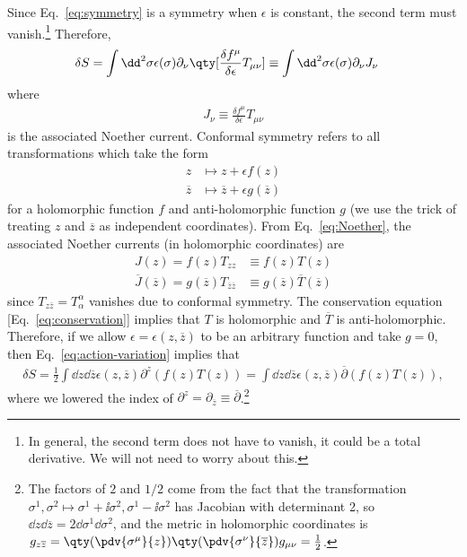 Since Eq.~\eqref{eq:symmetry} is a symmetry when $\epsilon$ is constant, the second term must
vanish.\footnote{In general, the second term does not have to vanish, it could be
  a total derivative. We will not need to worry about this.} Therefore,
\begin{align}
\delta S
&= \int \dd^2 \sigma \epsilon(\sigma) \partial_\nu \qty[\frac{\delta f^\mu}{\delta \epsilon}T_{\mu \nu}] \equiv \int \dd^2 \sigma \epsilon(\sigma) \partial_\nu J_\nu \label{eq:action-variation}
\end{align}
where
\begin{align}
J_\nu \equiv \frac{\delta f^\mu}{\delta \epsilon}T_{\mu \nu} \label{eq:Noether}
\end{align}
is the associated Noether current. Conformal symmetry refers to all transformations which take
the form
\begin{align}
 z &\mapsto z + \epsilon f(z) \\
 \overline z &\mapsto \overline z + \epsilon g(\overline z)
\end{align}
for a holomorphic function $f$ and anti-holomorphic function $g$ (we use the
trick of treating $z$ and $\overline z$ as independent coordinates).
From Eq.~\eqref{eq:Noether}, the associated Noether currents
(in holomorphic coordinates) are
\begin{align}
 J(z) = f(z) T_{z z} &\equiv  f(z) T(z) \\
  \overline J(\overline z) = g(\overline z)T_{\overline z \overline z} &\equiv g(\overline z) \overline T(\overline z)
\end{align}
since $T_{z\overline z} = T_\alpha^\alpha$ vanishes due to conformal symmetry.
The conservation equation [Eq.~\eqref{eq:conservation}] implies that $T$ is holomorphic and $\overline T$ is anti-holomorphic.
Therefore, if we allow $\epsilon = \epsilon(z, \overline z)$ to be an arbitrary
function and take $g=0$, then Eq.~\eqref{eq:action-variation} implies that
\begin{align}
\delta S = \frac{1}{2}\int \dd z \dd \overline z \epsilon(z, \overline z) \partial^z(f(z)T(z)) =  \int \dd z \dd \overline z \epsilon(z, \overline z) \overline \partial(f(z)T(z)),
\end{align}
where we lowered the index of $\partial^z = \partial_{\overline z} \equiv
\overline \partial$.\footnote{The factors of $2$ and $1/2$ come from the fact
  that the transformation $\sigma^1, \sigma^2 \mapsto \sigma^1+\ii \sigma^2, \sigma^1-\ii \sigma^2$ has Jacobian with
  determinant 2, so $\dd z \dd \overline z = 2\dd \sigma^1\dd \sigma^2$, and the
metric in holomorphic coordinates is $g_{z\overline z} =
\qty(\pdv{\sigma^\mu}{z})\qty(\pdv{\sigma^\nu}{\overline z})g_{\mu \nu} = \frac{1}{2}$.}

